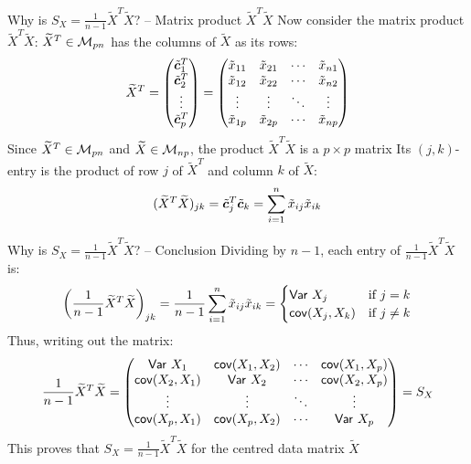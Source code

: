 \documentclass[aspectratio=169]{beamer}\usepackage[]{graphicx}\usepackage[]{xcolor}
\begin{document}
\begin{frame}{Why is $S_X = \frac{1}{n-1}\widetilde{X}^T\widetilde{X}$? -- Matrix product $\widetilde{X}^T\widetilde{X}$}
Now consider the matrix product $\widetilde{X}^T\widetilde{X}$:
\vfill
$\widetilde{X}^T \in \mathcal{M}_{pn}$ has the columns of $\widetilde{X}$ as its rows:
\[
\widetilde{X}^T = \begin{pmatrix} \tilde{\bm{c}}_1^T \\ \tilde{\bm{c}}_2^T \\ \vdots \\ \tilde{\bm{c}}_p^T \end{pmatrix}
= \begin{pmatrix}
\tilde{x}_{11} & \tilde{x}_{21} & \cdots & \tilde{x}_{n1} \\
\tilde{x}_{12} & \tilde{x}_{22} & \cdots & \tilde{x}_{n2} \\
\vdots & \vdots & \ddots & \vdots \\
\tilde{x}_{1p} & \tilde{x}_{2p} & \cdots & \tilde{x}_{np}
\end{pmatrix}
\]
\vfill
Since $\widetilde{X}^T\in\mathcal{M}_{pn}$ and $\widetilde{X}\in\mathcal{M}_{np}$, the product $\widetilde{X}^T\widetilde{X}$ is a $p\times p$ matrix
\vfill
Its $(j,k)$-entry is the product of row $j$ of $\widetilde{X}^T$ and column $k$ of $\widetilde{X}$:
\[
(\widetilde{X}^T\widetilde{X})_{jk} = \tilde{\bm{c}}_j^T\tilde{\bm{c}}_k = \sum_{i=1}^n \tilde{x}_{ij}\tilde{x}_{ik}
\]
\end{frame}

\begin{frame}{Why is $S_X = \frac{1}{n-1}\widetilde{X}^T\widetilde{X}$? -- Conclusion}
Dividing by $n-1$, each entry of $\frac{1}{n-1}\widetilde{X}^T\widetilde{X}$ is:
\[
\left(\frac{1}{n-1}\widetilde{X}^T\widetilde{X}\right)_{jk} = \frac{1}{n-1}\sum_{i=1}^n \tilde{x}_{ij}\tilde{x}_{ik} = 
\begin{cases}
\mathsf{Var}\  X_j & \text{if } j = k \\
\mathsf{cov}(X_j, X_k) & \text{if } j \neq k
\end{cases}
\]
\vfill
Thus, writing out the matrix:
\[
\frac{1}{n-1}\widetilde{X}^T\widetilde{X} = \begin{pmatrix}
\mathsf{Var}\  X_1 & \mathsf{cov}(X_1, X_2) & \cdots & \mathsf{cov}(X_1, X_p) \\
\mathsf{cov}(X_2, X_1) & \mathsf{Var}\  X_2 & \cdots & \mathsf{cov}(X_2, X_p) \\
\vdots & \vdots & \ddots & \vdots \\
\mathsf{cov}(X_p, X_1) & \mathsf{cov}(X_p, X_2) & \cdots & \mathsf{Var}\  X_p
\end{pmatrix} = S_X
\]
\vfill
This proves that $S_X = \frac{1}{n-1}\widetilde{X}^T\widetilde{X}$ for the centred data matrix $\widetilde{X}$
\end{frame}
\end{document}

